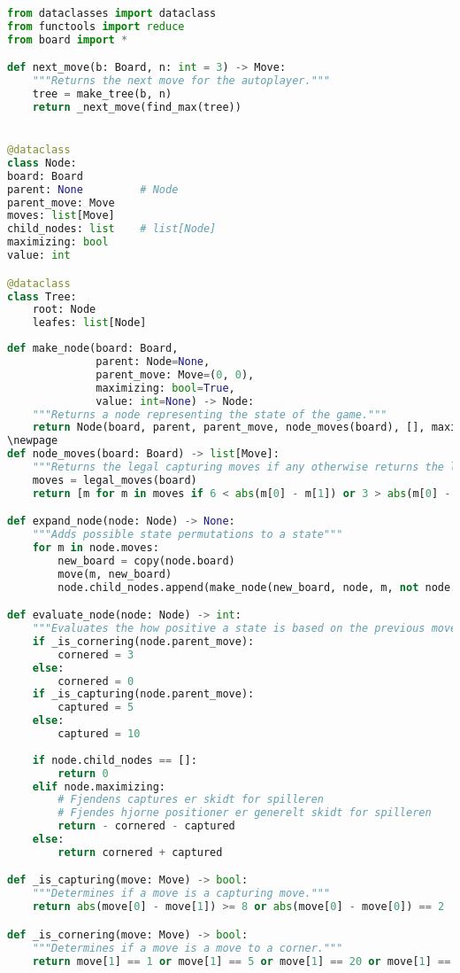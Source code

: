 \begin{lstlisting}[language=Python, caption={Datatyper}, label={code:datatyper}]
from dataclasses import dataclass
from functools import reduce
from board import *

def next_move(b: Board, n: int = 3) -> Move:
    """Returns the next move for the autoplayer."""
    tree = make_tree(b, n)
    return _next_move(find_max(tree))


@dataclass
class Node:
board: Board
parent: None         # Node
parent_move: Move
moves: list[Move]
child_nodes: list    # list[Node]
maximizing: bool
value: int

@dataclass
class Tree:
    root: Node
    leafes: list[Node]
\end{lstlisting}
\clearpage
\begin{lstlisting}[language=Python, caption={Funktioner for Node}, label={code:node}]
def make_node(board: Board,
              parent: Node=None,
              parent_move: Move=(0, 0),
              maximizing: bool=True,
              value: int=None) -> Node: 
    """Returns a node representing the state of the game."""
    return Node(board, parent, parent_move, node_moves(board), [], maximizing, value)
\newpage
def node_moves(board: Board) -> list[Move]:
    """Returns the legal capturing moves if any otherwise returns the legal moves."""
    moves = legal_moves(board)
    return [m for m in moves if 6 < abs(m[0] - m[1]) or 3 > abs(m[0] - m[1])] or moves

def expand_node(node: Node) -> None:
    """Adds possible state permutations to a state"""
    for m in node.moves:    
        new_board = copy(node.board)
        move(m, new_board)
        node.child_nodes.append(make_node(new_board, node, m, not node.maximizing))

def evaluate_node(node: Node) -> int:
    """Evaluates the how positive a state is based on the previous move (the enemy move)."""
    if _is_cornering(node.parent_move):
        cornered = 3
    else:
        cornered = 0
    if _is_capturing(node.parent_move):
        captured = 5
    else:
        captured = 10
    
    if node.child_nodes == []:
        return 0
    elif node.maximizing:
        # Fjendens captures er skidt for spilleren
        # Fjendes hjorne positioner er generelt skidt for spilleren
        return - cornered - captured
    else:
        return cornered + captured

def _is_capturing(move: Move) -> bool:
    """Determines if a move is a capturing move."""
    return abs(move[0] - move[1]) >= 8 or abs(move[0] - move[0]) == 2

def _is_cornering(move: Move) -> bool:
    """Determines if a move is a move to a corner."""
    return move[1] == 1 or move[1] == 5 or move[1] == 20 or move[1] == 25

\end{lstlisting}
